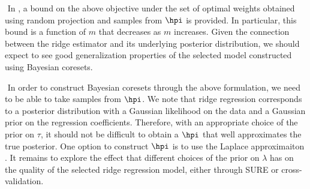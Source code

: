 $ $\newline
In \citet{campbell2019automated}, a bound on the above objective under the set of optimal weights obtained using random projection \citep{rahimi2007random} and samples from $\hpi$ is provided. In particular, this bound is a function of $m$ that decreases as $m$ increases. Given the connection between the ridge estimator and its underlying posterior distribution, we should expect to see good generalization properties of the selected model constructed using Bayesian coresets.

$ $\newline
In order to construct Bayesian coresets through the above formulation, we need to be able to take samples from $\hpi$. We note that ridge regression corresponds to a posterior distribution with a Gaussian likelihood on the data and a Gaussian prior on the regression coefficients. Therefore, with an appropriate choice of the prior on $\tau$, it should not be difficult to obtain a $\hpi$ that well approximates the true posterior. One option to construct $\hpi$ is to use the Laplace approximaiton \citep{bishop2006pattern}. It remains to explore the effect that different choices of the prior on $\lambda$ has on the quality of the selected ridge regression model, either through SURE or cross-validation.

